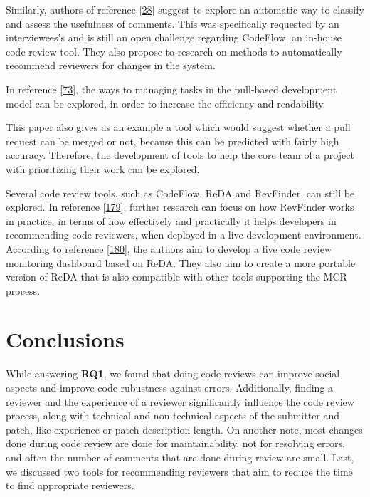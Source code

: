 \documentclass[]{book}
\begin{document}
Similarly, authors of reference
{[}\protect\hyperlink{ref-bird2015lessons}{28}{]} suggest to explore an
automatic way to classify and assess the usefulness of comments. This
was specifically requested by an interviewees's and is still an open
challenge regarding CodeFlow, an in-house code review tool. They also
propose to research on methods to automatically recommend reviewers for
changes in the system.

In reference {[}\protect\hyperlink{ref-gousios2014exploratory}{73}{]},
the ways to managing tasks in the pull-based development model can be
explored, in order to increase the efficiency and readability.

This paper also gives us an example a tool which would suggest whether a
pull request can be merged or not, because this can be predicted with
fairly high accuracy. Therefore, the development of tools to help the
core team of a project with prioritizing their work can be explored.

Several code review tools, such as CodeFlow, ReDA and RevFinder, can
still be explored. In reference
{[}\protect\hyperlink{ref-thongtanunam2015should}{179}{]}, further
research can focus on how RevFinder works in practice, in terms of how
effectively and practically it helps developers in recommending
code-reviewers, when deployed in a live development environment.
According to reference
{[}\protect\hyperlink{ref-thongtanunam2014reda}{180}{]}, the authors aim
to develop a live code review monitoring dashboard based on ReDA. They
also aim to create a more portable version of ReDA that is also
compatible with other tools supporting the MCR process.

\section{Conclusions}\label{conclusions}

While answering \textbf{RQ1}, we found that doing code reviews can
improve social aspects and improve code rubustness against errors.
Additionally, finding a reviewer and the experience of a reviewer
significantly influence the code review process, along with technical
and non-technical aspects of the submitter and patch, like experience or
patch description length. On another note, most changes done during code
review are done for maintainability, not for resolving errors, and often
the number of comments that are done during review are small. Last, we
discussed two tools for recommending reviewers that aim to reduce the
time to find appropriate reviewers.
\end{document}
